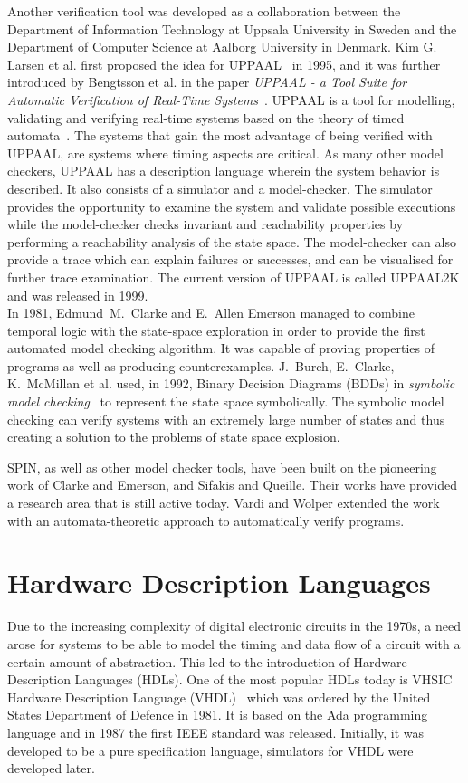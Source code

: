 Another verification tool was developed as a collaboration between the Department of Information Technology at Uppsala University in Sweden and the Department of Computer Science at Aalborg University in Denmark. Kim G. Larsen et al. first proposed the idea for UPPAAL~\cite{Larsen1995} in 1995, and it was further introduced by Bengtsson et al. in the paper \textit{UPPAAL - a Tool Suite for Automatic Verification of Real-Time Systems}~\cite{Bengtsson1995}.
UPPAAL is a tool for modelling, validating and verifying real-time systems based on the theory of timed automata~\cite{Alur1990}.
The systems that gain the most advantage of being verified with UPPAAL, are systems where timing aspects are critical.
As many other model checkers, UPPAAL has a description language wherein the system behavior is described. It also consists of a simulator and a model-checker. The simulator provides the opportunity to examine the system and validate possible executions while the model-checker checks invariant and reachability properties by performing a reachability analysis of the state space. The model-checker can also provide a trace which can explain failures or successes, and can be visualised for further trace examination.
The current version of UPPAAL is called UPPAAL2K and was released in 1999\cite{Amnell2001}.\\

In 1981, Edmund~M.~Clarke and E.~Allen Emerson managed to combine temporal logic with the state-space exploration in order to provide the first automated model checking algorithm\cite{Clarke1981}. It was capable of proving properties of programs as well as producing counterexamples.
J.~Burch, E.~Clarke, K.~McMillan et al. used, in 1992, Binary Decision Diagrams (BDDs) in \textit{symbolic model checking}~\cite{Burch1992} to represent the state space symbolically. The symbolic model checking can verify systems with an extremely large number of states and thus creating a solution to the problems of state space explosion.

SPIN, as well as other model checker tools, have been built on the pioneering work of Clarke and Emerson\cite{Clarke1981}, and Sifakis and Queille\cite{Queille1982}. Their works have provided a research area that is still active today. Vardi and Wolper extended the work with an automata-theoretic approach to automatically verify programs\cite{Vardi1986}.\\

\section{Hardware Description Languages}
Due to the increasing complexity of digital electronic circuits in the 1970s, a need arose for systems to be able to model the timing and data flow of a circuit with a certain amount of abstraction. This led to the introduction of Hardware Description Languages (HDLs). One of the most popular HDLs today is VHSIC Hardware Description Language (VHDL)~\cite{VHDL} which was ordered by the United States Department of Defence in 1981. It is based on the Ada programming language and in 1987 the first IEEE standard was released. Initially, it was developed to be a pure specification language, simulators for VHDL were developed later.

